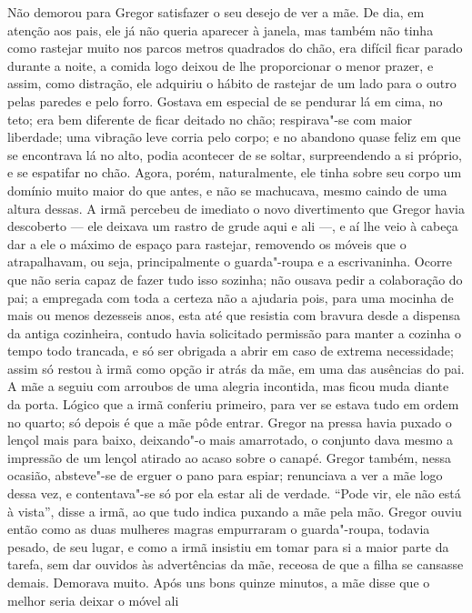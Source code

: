 Não demorou para Gregor satisfazer o seu desejo de ver a mãe. De dia, em
atenção aos pais, ele já não queria aparecer à janela, mas também não
tinha como rastejar muito nos parcos metros quadrados do chão, era difícil
ficar parado durante a noite, a comida logo deixou de lhe proporcionar o
menor prazer, e assim, como distração, ele adquiriu o hábito de rastejar
de um lado para o outro pelas paredes e pelo forro. Gostava em especial de
se pendurar lá em cima, no teto; era bem diferente de ficar deitado no
chão; respirava"-se com maior liberdade; uma vibração leve corria pelo
corpo; e no abandono quase feliz em que se encontrava lá no alto, podia
acontecer de se soltar, surpreendendo a si próprio, e se espatifar no
chão. Agora, porém, naturalmente, ele tinha sobre seu corpo um domínio
muito maior do que antes, e não se machucava, mesmo caindo de uma altura
dessas. A irmã percebeu de imediato o novo divertimento que Gregor havia
descoberto --- ele deixava um rastro de grude aqui e ali ---, e aí lhe veio à
cabeça dar a ele o máximo de espaço para rastejar, removendo os móveis que
o atrapalhavam, ou seja, principalmente o guarda"-roupa e a escrivaninha.
Ocorre que não seria capaz de fazer tudo isso sozinha; não ousava pedir a
colaboração do pai; a empregada com toda a certeza não a ajudaria pois,
para uma mocinha de mais ou menos dezesseis anos, esta até que resistia
com bravura desde a dispensa da antiga cozinheira, contudo havia
solicitado permissão para manter a cozinha o tempo todo trancada, e só ser
obrigada a abrir em caso de extrema necessidade; assim só restou à irmã
como opção ir atrás da mãe, em uma das ausências do pai. A mãe a seguiu
com arroubos de uma alegria incontida, mas ficou muda diante da porta.
Lógico que a irmã conferiu primeiro, para ver se estava tudo em ordem no
quarto; só depois é que a mãe pôde entrar. Gregor na pressa havia puxado o
lençol mais para baixo, deixando"-o mais amarrotado, o conjunto dava mesmo
a impressão de um lençol atirado ao acaso sobre o canapé. Gregor também,
nessa ocasião, absteve"-se de erguer o pano para espiar; renunciava a ver a
mãe logo dessa vez, e contentava"-se só por ela estar ali de verdade. “Pode
vir, ele não está à vista”, disse a irmã, ao que tudo indica puxando a mãe
pela mão. Gregor ouviu então como as duas mulheres magras empurraram o
guarda"-roupa, todavia pesado, de seu lugar, e como a irmã insistiu em
tomar para si a maior parte da tarefa, sem dar ouvidos às advertências da
mãe, receosa de que a filha se cansasse demais. Demorava muito. Após uns
bons quinze minutos, a mãe disse que o melhor seria deixar o móvel ali
